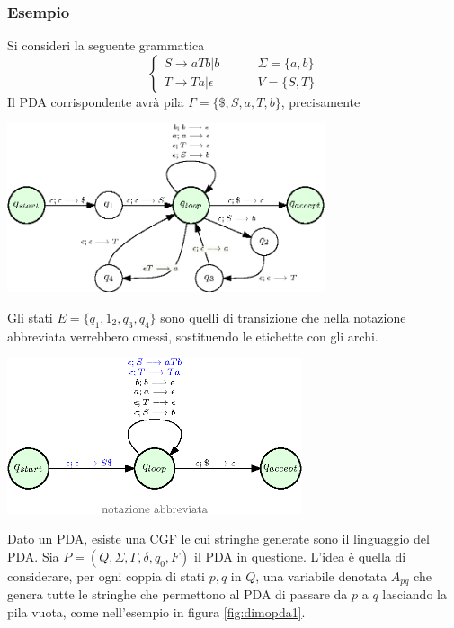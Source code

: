 \documentclass[10pt, letterpaper]{report}
\begin{document}
\subsubsection{Esempio} 
Si consideri la seguente grammatica 
$$ \begin{cases}
    S\longrightarrow aTb|b\\ 
    T\longrightarrow Ta|\epsilon 
\end{cases} \ \ \ \ \ \ \ \ \ \ \begin{matrix}
    \Sigma = \{a,b\}\\ V=\{S,T\}
\end{matrix}$$
Il PDA corrispondente avrà pila $\Gamma = \{\$, S, a, T, b\}$, precisamente\begin{center}
    \includegraphics[width=0.7\textwidth ]{images/PDA2.eps}
\end{center}
Gli stati $E=\{q_1,1_2,q_3,q_4\}$ sono quelli di transizione che nella notazione abbreviata verrebbero 
omessi, sostituendo le etichette con gli archi.
\begin{center}
    \includegraphics[width=0.65\textwidth ]{images/PDA2.2.eps}
\end{center}
\lemma{[$\impliedby$]}  Dato un PDA, esiste una CGF le cui stringhe generate sono il linguaggio del PDA.\acc 
\dimo{[$\impliedby$]} Sia $P=(Q,\Sigma,\Gamma,\delta,q_0,F)$ il PDA in questione. L'idea è quella di considerare,
 per ogni coppia di stati $p,q$ in $Q$, una variabile denotata $A_{pq}$ che genera tutte le stringhe 
 che permettono al PDA di passare da $p$ a $q$ lasciando la pila vuota, come nell'esempio in figura \ref{fig:dimopda1}.
\end{document}
